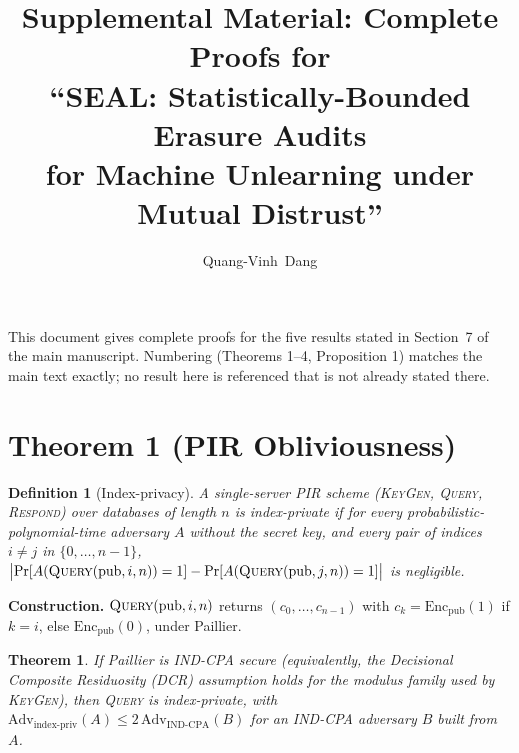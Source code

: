 \documentclass[10pt,journal,compsoc]{IEEEtran}
\newtheorem{definition}{Definition}
\newtheorem{theorem}{Theorem}
\begin{document}
\title{Supplemental Material: Complete Proofs for\\``SEAL: Statistically-Bounded Erasure Audits\\for Machine Unlearning under Mutual Distrust''}

\author{Quang-Vinh~Dang}

\maketitle

\noindent This document gives complete proofs for the five results stated in Section~7 of the main manuscript. Numbering (Theorems 1--4, Proposition 1) matches the main text exactly; no result here is referenced that is not already stated there.

\section*{Theorem 1 (PIR Obliviousness)}

\begin{definition}[Index-privacy]
A single-server PIR scheme (\textsc{KeyGen}, \textsc{Query}, \textsc{Respond}) over databases of length $n$ is \emph{index-private} if for every probabilistic-polynomial-time adversary $A$ without the secret key, and every pair of indices $i \neq j$ in $\{0,\ldots,n-1\}$, $\bigl|\Pr[A(\textsc{Query}(\mathrm{pub},i,n))=1] - \Pr[A(\textsc{Query}(\mathrm{pub},j,n))=1]\bigr|$ is negligible.
\end{definition}

\textbf{Construction.} $\textsc{Query}(\mathrm{pub},i,n)$ returns $(c_0,\ldots,c_{n-1})$ with $c_k = \mathrm{Enc}_{\mathrm{pub}}(1)$ if $k=i$, else $\mathrm{Enc}_{\mathrm{pub}}(0)$, under Paillier.

\begin{theorem}
If Paillier is IND-CPA secure (equivalently, the Decisional Composite Residuosity (DCR) assumption holds for the modulus family used by \textsc{KeyGen}), then \textsc{Query} is index-private, with $\mathrm{Adv}_{\text{index-priv}}(A) \le 2\,\mathrm{Adv}_{\text{IND-CPA}}(B)$ for an IND-CPA adversary $B$ built from $A$.
\end{theorem}
\end{document}
